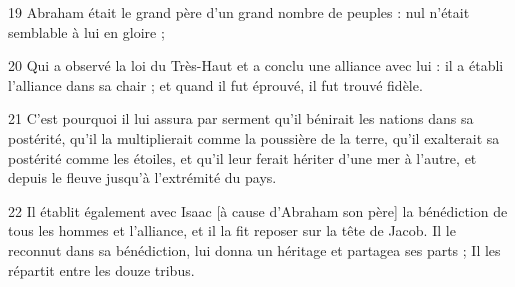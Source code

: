 \par 19 Abraham était le grand père d'un grand nombre de peuples : nul n'était semblable à lui en gloire ;
\par 20 Qui a observé la loi du Très-Haut et a conclu une alliance avec lui : il a établi l'alliance dans sa chair ; et quand il fut éprouvé, il fut trouvé fidèle.
\par 21 C'est pourquoi il lui assura par serment qu'il bénirait les nations dans sa postérité, qu'il la multiplierait comme la poussière de la terre, qu'il exalterait sa postérité comme les étoiles, et qu'il leur ferait hériter d'une mer à l'autre, et depuis le fleuve jusqu'à l'extrémité du pays.
\par 22 Il établit également avec Isaac [à cause d'Abraham son père] la bénédiction de tous les hommes et l'alliance, et il la fit reposer sur la tête de Jacob. Il le reconnut dans sa bénédiction, lui donna un héritage et partagea ses parts ; Il les répartit entre les douze tribus.


